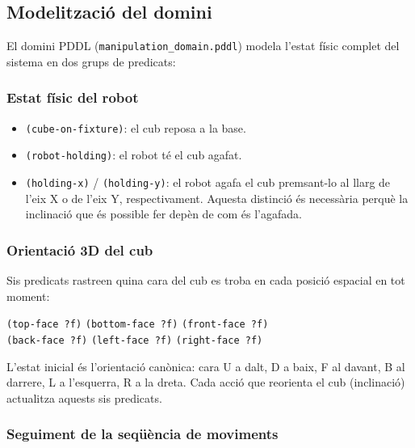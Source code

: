 \documentclass[12pt, a4paper]{article}
\begin{document}
\subsection{Modelització del domini}

El domini PDDL (\texttt{manipulation\_domain.pddl}) modela l'estat físic complet del sistema en dos grups de predicats:

\subsubsection{Estat físic del robot}

\begin{itemize}
  \item \texttt{(cube-on-fixture)}: el cub reposa a la base.
  \item \texttt{(robot-holding)}: el robot té el cub agafat.
  \item \texttt{(holding-x)} / \texttt{(holding-y)}: el robot agafa el cub premsant-lo al llarg de l'eix X o de l'eix Y, respectivament. Aquesta distinció és necessària perquè la inclinació que és possible fer depèn de com és l'agafada.
\end{itemize}

\subsubsection{Orientació 3D del cub}

Sis predicats rastreen quina cara del cub es troba en cada posició espacial en tot moment:

\begin{center}
\texttt{(top-face ?f)} \quad \texttt{(bottom-face ?f)} \quad \texttt{(front-face ?f)}\\[2pt]
\texttt{(back-face ?f)} \quad \texttt{(left-face ?f)} \quad \texttt{(right-face ?f)}
\end{center}

L'estat inicial és l'orientació canònica: cara U a dalt, D a baix, F al davant, B al darrere, L a l'esquerra, R a la dreta. Cada acció que reorienta el cub (inclinació) actualitza aquests sis predicats.

\subsubsection{Seguiment de la seqüència de moviments}
\end{document}
